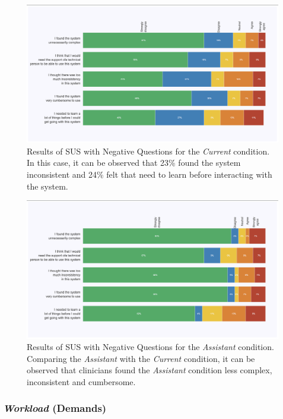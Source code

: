 \begin{figure}[htbp]
\centering
\includegraphics[width=\textwidth]{images/fig035}
\caption{Results of SUS with Negative Questions for the {\it Current} condition. In this case, it can be observed that 23\% found the system inconsistent and 24\% felt that need to learn before interacting with the system.}
\label{fig:fig035}
\end{figure}

\begin{figure}[htbp]
\centering
\includegraphics[width=\textwidth]{images/fig036}
\caption{Results of SUS with Negative Questions for the {\it Assistant} condition. Comparing the {\it Assistant} with the {\it Current} condition, it can be observed that clinicians found the {\it Assistant} condition less complex, inconsistent and cumbersome.}
\label{fig:fig036}
\end{figure}

\subsubsection{{\it Workload} (Demands)}
\label{sec:sec005006001003}

